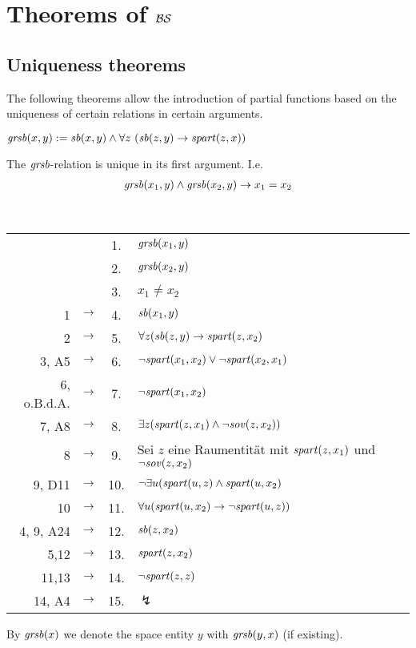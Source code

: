 \section{Theorems of $\mathcal{BS}$}

\subsection{Uniqueness theorems}
The following theorems allow the introduction of partial functions based on the uniqueness of certain relations in certain arguments.

\begin{erin}
    $\Ggrsb(x,y) := \Gsb(x,y) \wedge \forall z\ (\Gsb(z,y) \to \Gspart(z,x))$
\end{erin}

\begin{satz}
    The $\mathit{gr\hspace*{-0.25ex}sb}$-relation is unique in its first argument. I.e.
    \begin{align*}
        \mathit{gr\hspace*{-0.25ex}sb}(x_1,y) \land \mathit{gr\hspace*{-0.25ex}sb}(x_2,y) \to x_1 = x_2
    \end{align*}
\end{satz}

\begin{bew}\ \\
    \begin{longtable}{r c c l}
        & & 1. & $\mathit{gr\hspace*{-0.25ex}sb}(x_1,y)$\\
        & & 2. & $\mathit{gr\hspace*{-0.25ex}sb}(x_2,y)$ \\
        & & 3. & $x_1 \neq x_2$ \\
        1 & $\rightarrow$ & 4. & $\mathit{sb}(x_1,y)$ \\
        2 & $\rightarrow$ & 5. & $\forall z (\mathit{sb}(z,y) \to \mathit{spart}(z,x_2)$ \\
        3, A5 & $\rightarrow$ & 6. & $\neg \mathit{spart}(x_1,x_2) \lor \neg \mathit{spart}(x_2,x_1)$ \\
        6, o.B.d.A. & $\rightarrow$ & 7. & $\neg \mathit{spart}(x_1,x_2)$ \\
        7, A8 & $\rightarrow$ & 8. & $\exists z (\mathit{spart}(z,x_1) \land \neg \mathit{sov}(z,x_2))$\\
        8 & $\rightarrow$ & 9. & Sei $z$ eine Raumentität mit $\mathit{spart}(z,x_1)$ und $\neg \mathit{sov}(z,x_2)$\\
        9, D11 & $\rightarrow$ & 10. & $\neg \exists u (\mathit{spart}(u,z) \land \mathit{spart}(u,x_2)$ \\
        10 & $\rightarrow$ & 11. & $\forall u (\mathit{spart}(u,x_2) \to \neg \mathit{spart}(u,z))$\\
        4, 9, A24 & $\rightarrow$ & 12. & $\mathit{sb}(z,x_2)$\\
        5,12 & $\rightarrow$ & 13. & $\mathit{spart}(z,x_2)$\\
        11,13 & $\rightarrow$ & 14. & $\neg \mathit{spart}(z,z)$\\
        14, A4 & $\rightarrow$ & 15. & $\lightning$\\
    \end{longtable}
\end{bew}

\begin{konv}
    By $\mathit{gr\hspace*{-0.25ex}sb}(x)$ we denote the space entity $y$ with $\mathit{gr\hspace*{-0.25ex}sb}(y,x)$ (if existing).
\end{konv}




